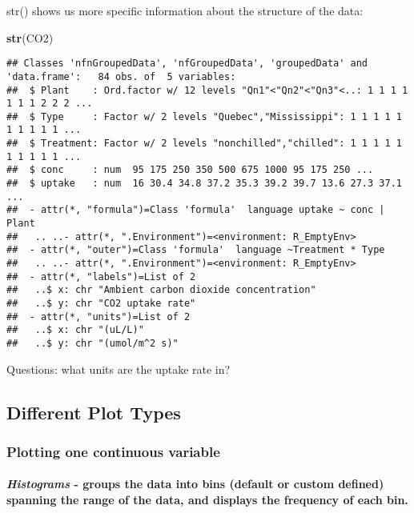 \documentclass[]{article}
\newenvironment{Shaded}{\begin{snugshade}}{\end{snugshade}}
\newcommand{\KeywordTok}[1]{\textcolor[rgb]{0.13,0.29,0.53}{\textbf{#1}}}
\newcommand{\NormalTok}[1]{#1}
\let\oldparagraph\paragraph
\renewcommand{\paragraph}[1]{\oldparagraph{#1}\mbox{}}
\begin{document}
str() shows us more specific information about the structure of the
data:

\begin{Shaded}
\begin{Highlighting}[]
\KeywordTok{str}\NormalTok{(CO2)}
\end{Highlighting}
\end{Shaded}

\begin{verbatim}
## Classes 'nfnGroupedData', 'nfGroupedData', 'groupedData' and 'data.frame':   84 obs. of  5 variables:
##  $ Plant    : Ord.factor w/ 12 levels "Qn1"<"Qn2"<"Qn3"<..: 1 1 1 1 1 1 1 2 2 2 ...
##  $ Type     : Factor w/ 2 levels "Quebec","Mississippi": 1 1 1 1 1 1 1 1 1 1 ...
##  $ Treatment: Factor w/ 2 levels "nonchilled","chilled": 1 1 1 1 1 1 1 1 1 1 ...
##  $ conc     : num  95 175 250 350 500 675 1000 95 175 250 ...
##  $ uptake   : num  16 30.4 34.8 37.2 35.3 39.2 39.7 13.6 27.3 37.1 ...
##  - attr(*, "formula")=Class 'formula'  language uptake ~ conc | Plant
##   .. ..- attr(*, ".Environment")=<environment: R_EmptyEnv> 
##  - attr(*, "outer")=Class 'formula'  language ~Treatment * Type
##   .. ..- attr(*, ".Environment")=<environment: R_EmptyEnv> 
##  - attr(*, "labels")=List of 2
##   ..$ x: chr "Ambient carbon dioxide concentration"
##   ..$ y: chr "CO2 uptake rate"
##  - attr(*, "units")=List of 2
##   ..$ x: chr "(uL/L)"
##   ..$ y: chr "(umol/m^2 s)"
\end{verbatim}

Questions: what units are the uptake rate in?

\hypertarget{different-plot-types}{%
\subsection{Different Plot Types}\label{different-plot-types}}

\hypertarget{plotting-one-continuous-variable}{%
\subsubsection{Plotting one continuous
variable}\label{plotting-one-continuous-variable}}

\hypertarget{histograms---groups-the-data-into-bins-default-or-custom-defined-spanning-the-range-of-the-data-and-displays-the-frequency-of-each-bin.}{%
\paragraph{\texorpdfstring{\emph{Histograms} - groups the data into bins
(default or custom defined) spanning the range of the data, and displays
the frequency of each
bin.}{Histograms - groups the data into bins (default or custom defined) spanning the range of the data, and displays the frequency of each bin.}}\label{histograms---groups-the-data-into-bins-default-or-custom-defined-spanning-the-range-of-the-data-and-displays-the-frequency-of-each-bin.}}
\end{document}
